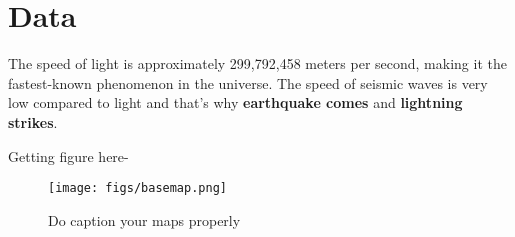 \chapter{Data}
The speed of light is approximately 299,792,458 meters per second, making it the fastest-known phenomenon in the universe. The speed of seismic waves is very low compared to light and that's why \textbf{earthquake comes} and \textbf{lightning strikes}.

Getting figure here- 

\begin{figure}[H]
    \centering
    \texttt{[image: figs/basemap.png]}
    \caption{ Do caption your maps properly}
    \label{fig:well}
\end{figure}


\newpage